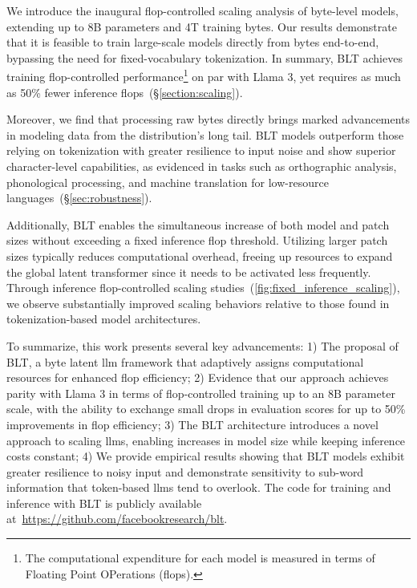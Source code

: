 We introduce the inaugural flop-controlled scaling analysis of byte-level models, extending up to 8B parameters and 4T training bytes. Our results demonstrate that it is feasible to train large-scale models directly from bytes end-to-end, bypassing the need for fixed-vocabulary tokenization. In summary, {\textsc BLT} achieves training flop-controlled performance\footnote{The computational expenditure for each model is measured in terms of Floating Point OPerations (flops).} on par with Llama 3, yet requires as much as 50\% fewer inference flops~(\S\ref{section:scaling}).

Moreover, we find that processing raw bytes directly brings marked advancements in modeling data from the distribution’s long tail. {\textsc BLT} models outperform those relying on tokenization with greater resilience to input noise and show superior character-level capabilities, as evidenced in tasks such as orthographic analysis, phonological processing, and machine translation for low-resource languages~(\S\ref{sec:robustness}).

Additionally, {\textsc BLT} enables the simultaneous increase of both model and patch sizes without exceeding a fixed inference flop threshold. Utilizing larger patch sizes typically reduces computational overhead, freeing up resources to expand the global latent transformer since it needs to be activated less frequently. Through inference flop-controlled scaling studies~(\autoref{fig:fixed_inference_scaling}), we observe substantially improved scaling behaviors relative to those found in tokenization-based model architectures.

To summarize, this work presents several key advancements: 1) The proposal of {\textsc BLT}, a byte latent llm framework that adaptively assigns computational resources for enhanced flop efficiency; 2) Evidence that our approach achieves parity with Llama 3 in terms of flop-controlled training up to an 8B parameter scale, with the ability to exchange small drops in evaluation scores for up to 50\% improvements in flop efficiency; 3) The {\textsc BLT} architecture introduces a novel approach to scaling llms, enabling increases in model size while keeping inference costs constant; 4) We provide empirical results showing that {\textsc BLT} models exhibit greater resilience to noisy input and demonstrate sensitivity to sub-word information that token-based llms tend to overlook. The code for training and inference with {\textsc BLT} is publicly available at~\url{https://github.com/facebookresearch/blt}.

